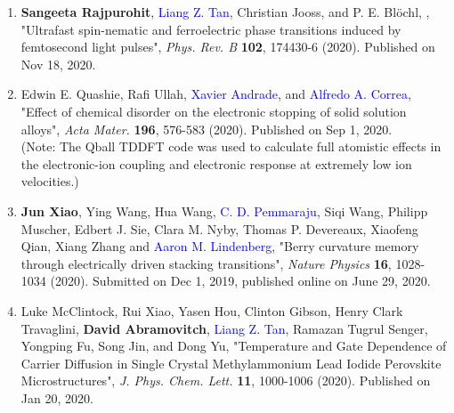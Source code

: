 \begin{enumerate}
    \item  {\bf Sangeeta Rajpurohit}, \textcolor{blue}{Liang Z. Tan},  Christian Jooss, and P. E. Bl\"ochl, , "Ultrafast spin-nematic and ferroelectric phase transitions induced by femtosecond light pulses", {\it Phys. Rev. B} {\bf 102}, 174430-6 (2020). Published on Nov 18, 2020.

    \item Edwin E. Quashie, Rafi Ullah, \textcolor{blue}{Xavier Andrade}, and \textcolor{blue}{Alfredo A. Correa}, "Effect of chemical disorder on the electronic stopping of solid solution alloys", {\it Acta Mater.} {\bf 196}, 576-583 (2020). Published on Sep 1, 2020.\\
    (Note: The Qball TDDFT code was used to calculate full atomistic effects in the electronic-ion coupling and electronic response at extremely low ion velocities.)
        

    \item {\bf Jun Xiao}, Ying Wang, Hua Wang, \textcolor{blue}{C. D. Pemmaraju}, Siqi Wang, Philipp Muscher, Edbert J. Sie, Clara M. Nyby, Thomas P. Devereaux, Xiaofeng Qian, Xiang Zhang and \textcolor{blue}{Aaron M. Lindenberg}, "Berry curvature memory through electrically driven stacking transitions", {\it Nature Physics} {\bf 16}, 1028-1034 (2020). Submitted on Dec 1, 2019, published online on June 29, 2020.

    \item  Luke McClintock, Rui Xiao, Yasen Hou, Clinton Gibson, Henry Clark Travaglini, {\bf David Abramovitch}, \textcolor{blue}{Liang Z. Tan}, Ramazan Tugrul Senger, Yongping Fu, Song Jin, and Dong Yu, "Temperature and Gate Dependence of Carrier Diffusion in Single Crystal Methylammonium Lead Iodide Perovskite Microstructures", {\it J. Phys. Chem. Lett.} {\bf 11}, 1000-1006 (2020). Published on Jan 20, 2020.

\end{enumerate}

\clearpage
